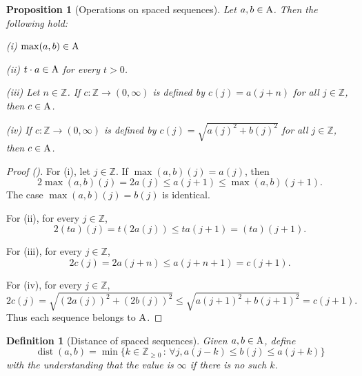 \documentclass[12pt,reqno]{amsart}
\newcommand{\auto}{{({\tiny\faCar})}}
\theoremstyle{plain}
\newtheorem{proposition}[theorem]{Proposition}
\newtheorem{definition}[theorem]{Definition}
\numberwithin{equation}{section}
\theoremstyle{remark}
\newcommand{\uses}[1]{}
\newcommand{\usesdefs}[1]{}
\newcommand{\Z}{{\mathbb Z}}
\DeclareMathOperator{\dist}{dist}
\begin{document}
\begin{proposition}[Operations on spaced sequences]\label{Operations on spaced sequences}\uses{}\usesdefs{multiplicatively spaced monotone sequences}
    Let $a,b\in {\rm A}$. Then the following hold:

    (i) $\max(a,b)\in {\rm A}$

    (ii) $t\cdot a\in {\rm A}$ for every $t>0$.

    (iii) Let $n\in\mathbb{Z}$. If $c:\Z\to(0,\infty)$ is defined by $c(j)=a(j+n)$ for all $j\in\mathbb{Z}$, then $c\in {\rm A}$.

    (iv) If $c:\Z\to (0,\infty)$ is defined by $c(j)=\sqrt{a(j)^2+b(j)^2}$ for all $j\in\Z$, then $c\in {\rm A}$.
\end{proposition}
\begin{proof}[Proof \auto]
For (i), let $j\in\Z$. If $\max(a,b)(j)=a(j)$, then
\[
2\max(a,b)(j)=2a(j)\le a(j+1)\le\max(a,b)(j+1).
\]
The case $\max(a,b)(j)=b(j)$ is identical.

For (ii), for every $j\in\Z$,
\[
2(ta)(j)=t(2a(j))\le ta(j+1)=(ta)(j+1).
\]

For (iii), for every $j\in\Z$,
\[
2c(j)=2a(j+n)\le a(j+n+1)=c(j+1).
\]

For (iv), for every $j\in\Z$,
\[
2c(j)=\sqrt{(2a(j))^2+(2b(j))^2}
\le\sqrt{a(j+1)^2+b(j+1)^2}=c(j+1).
\]
Thus each sequence belongs to ${\rm A}$.
\end{proof}


\begin{definition}[Distance of spaced sequences]\label{Distance of spaced sequences}\uses{}\usesdefs{multiplicatively spaced monotone sequences}
Given $a,b\in {\rm A}$, define
\begin{equation}\label{auto:spaced-sequence-distance}
    \dist(a,b)=\min\{k\in\mathbb{Z}_{\ge 0}\,:\,\forall j, a(j-k)\le b(j)\le a(j+k)\}
\end{equation}
with the understanding that the value is $\infty$ if there is no such $k$.
\end{definition}
\end{document}
